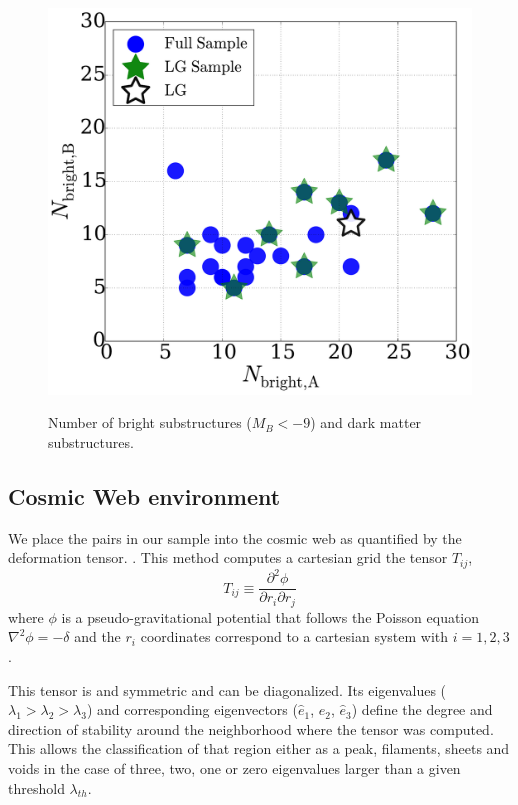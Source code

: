 \documentclass{emulateapj}
\begin{document}
\begin{figure}
\centering
\includegraphics[width=\hsize]{n_structure.pdf}\\
\caption{Number of bright substructures ($M_{B}<-9$) and dark matter
  substructures.}
\label{fig:nstructure}
\end{figure}


\subsection{Cosmic Web environment}

We place the pairs in our sample into the cosmic web as quantified by
the deformation tensor.
\citep{2007MNRAS.375..489H,2009MNRAS.396.1815F}.
This method computes a cartesian grid the tensor $T_{ij}$,
\begin{equation}
T_{ij} \equiv \frac{\partial^2\phi}{\partial r_i \partial r_j}
\end{equation}
%
where $\phi$ is a pseudo-gravitational potential that follows the
Poisson equation $\nabla^2\phi=-\delta$ and the $r_i$ coordinates
correspond to a cartesian system with $i=1,2,3$. 

This tensor is and symmetric and can be diagonalized.
Its eigenvalues ($\lambda_1 > \lambda_2 > \lambda_3$) and
corresponding eigenvectors ($\hat{e}_1$, $\hat{e}_2$, $\hat{e}_3$)
define the degree and direction of stability around the neighborhood
where the tensor was computed. 
This allows the classification of that region either as a peak,
filaments, sheets and voids in the case of three, two, one or zero
eigenvalues larger than a given threshold $\lambda_{th}$.
\end{document}
